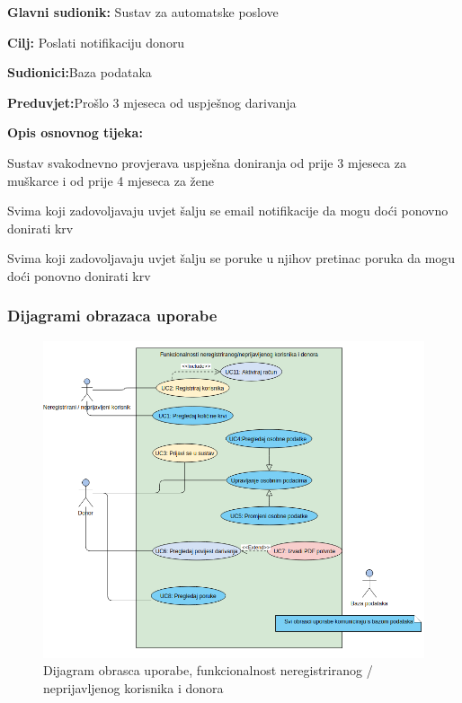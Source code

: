 \noindent {}
\begin{packed_item}
	
	\item \textbf{Glavni sudionik: }{Sustav za automatske poslove}
	\item  \textbf{Cilj:} {Poslati notifikaciju donoru}
	\item  \textbf{Sudionici:}{Baza podataka}
	\item  \textbf{Preduvjet:}{Prošlo 3 mjeseca od uspješnog darivanja}
	\item  \textbf{Opis osnovnog tijeka:}
	
	\item[] \begin{packed_enum}
		
		\item {Sustav svakodnevno provjerava uspješna doniranja od prije 3 mjeseca za muškarce i od prije 4 mjeseca za žene}
		\item {Svima koji zadovoljavaju uvjet šalju se email notifikacije da mogu doći ponovno donirati krv}
		\item {Svima koji zadovoljavaju uvjet šalju se poruke u njihov pretinac poruka da mogu doći ponovno donirati krv}
		
	\end{packed_enum}
	
\end{packed_item}


\subsubsection{Dijagrami obrazaca uporabe}
\begin{figure}[H]
			\includegraphics[scale=0.6]{dijagrami/Funkcionalnosti_korisnika_donora.png} %
			\centering
			\caption{Dijagram obrasca uporabe, funkcionalnost neregistriranog / neprijavljenog korisnika i donora}
			\label{fig:Funkcionalnosti_korisnika_donora}
\end{figure}

